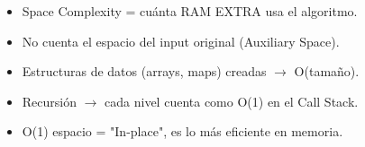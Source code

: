 \begin{dsaresumen}

\begin{itemize}
    \item Space Complexity = cuánta RAM EXTRA usa el algoritmo.
    \item No cuenta el espacio del input original (Auxiliary Space).
    \item Estructuras de datos (arrays, maps) creadas $\rightarrow$ O(tamaño).
    \item Recursión $\rightarrow$ cada nivel cuenta como O(1) en el Call Stack.
    \item O(1) espacio = "In-place", es lo más eficiente en memoria.
\end{itemize}

\end{dsaresumen}


